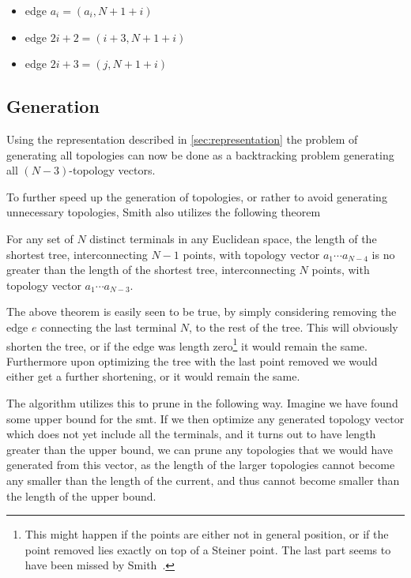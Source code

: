 \begin{itemize}
\item edge $a_{i} = (a_{i},N+1+i)$
\item edge $ 2i + 2 = (i+3,N+1+i)$
\item edge $ 2i + 3 = (j,N+1+i)$
\end{itemize}

\subsection{Generation}
\label{sec:generation}

Using the representation described in \cref{sec:representation} the problem of
generating all topologies can now be done as a backtracking problem generating
all $(N-3)$-topology vectors.

To further speed up the generation of topologies, or rather to avoid generating
unnecessary topologies, Smith also utilizes the following theorem

\begin{theorem} For any set of $N$ distinct terminals in any Euclidean space,
the length of the shortest tree, interconnecting $N-1$ points, with topology
vector $a_1 \cdots a_{N-4}$ is no greater than the length of the shortest tree,
interconnecting $N$ points, with topology vector $a_1 \cdots a_{N-3}$.
\end{theorem}

The above theorem is easily seen to be true, by simply considering removing the
edge $e$ connecting the last terminal $N$, to the rest of the tree.  This will
obviously shorten the tree, or if the edge was length zero\footnote{This might
happen if the points are either not in general position, or if the point removed
lies exactly on top of a Steiner point.  The last part seems to have been missed
by Smith~\cite[p.~144]{Smith1992}.} it would remain the same.  Furthermore upon
optimizing the tree with the last point removed we would either get a further
shortening, or it would remain the same.

The algorithm utilizes this to prune in the following way.  Imagine we have
found some upper bound for the \gls{smt}.  If we then optimize any generated
topology vector which does not yet include all the terminals, and it turns out
to have length greater than the upper bound, we can prune any topologies that we
would have generated from this vector, as the length of the larger topologies
cannot become any smaller than the length of the current, and thus cannot become
smaller than the length of the upper bound.

